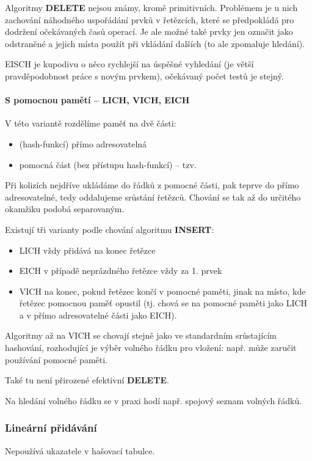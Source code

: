 \documentclass[11pt]{report} %
\numberwithin{equation}{section}
\begin{document}
Algoritmy \textbf{DELETE} nejsou známy, kromě primitivních. Problémem je u nich zachování náhodného uspořádání prvků v řetězcích, které se předpokládá pro dodržení očekávaných časů operací. Je ale možné také prvky jen označit jako odstraněné a jejich místa použít při vkládání dalších (to ale zpomaluje hledání).

EISCH je kupodivu o něco rychlejší na úspěšné vyhledání (je větší pravděpodobnost práce s novým prvkem), očekávaný počet testů je stejný.

\paragraph{S pomocnou pamětí -- LICH, VICH, EICH}
V této variantě rozdělíme paměť na dvě části:
\begin{itemize}
	
	\item (hash-funkcí) přímo adresovatelná
	\item pomocná část (bez přístupu hash-funkcí) -- tzv. 
\end{itemize}

Při kolizích nejdříve ukládáme do řádků z pomocné části, pak teprve do přímo adresovatelné, tedy oddalujeme srůstání řetězců. Chování se tak až do určitého okamžiku podobá separovaným.

Existují tři varianty podle chování algoritmu \textbf{INSERT}:

\begin{itemize}
	\item LICH vždy přidává na konec řetězce
	\item EICH v případě neprázdného řetězce vždy za 1. prvek 
	\item VICH na konec, pokud řetězec končí v pomocné paměti, jinak na místo, kde řetězec pomocnou paměť opustil (tj. chová se na pomocné paměti jako LICH a v přímo adresovatelné části jako EICH).
\end{itemize}

Algoritmy až na VICH se chovají stejně jako ve standardním srůstajícím hashování, rozhodující je výběr volného řádku pro vložení: např.  může zaručit používání pomocné paměti. 

Také tu není přirozené efektivní \textbf{DELETE}.

Na hledání volného řádku se v praxi hodí např. spojový seznam volných řádků.


\subsubsection{Lineární přidávání}
Nepoužívá ukazatele v hašovací tabulce. 
\end{document}
